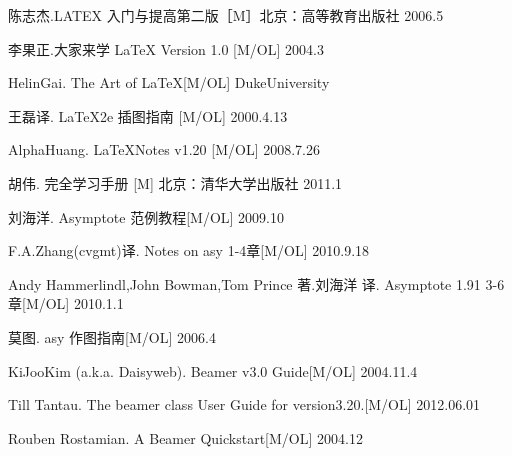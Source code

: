 \begin{thebibliography}{99} %
\setlength{\parskip}{0pt}  %

 陈志杰.LATEX 入门与提高第二版［M］北京：高等教育出版社 2006.5

 李果正.大家来学 \LaTeX{} Version 1.0 [M/OL] 2004.3

 HelinGai. The Art of \LaTeX [M/OL]  DukeUniversity

 王磊译.  \LaTeX2e 插图指南 [M/OL]  2000.4.13

 AlphaHuang. \LaTeX Notes v1.20 [M/OL]  2008.7.26

 胡伟. \LaTeXe 完全学习手册 [M]  北京：清华大学出版社 2011.1

刘海洋. Asymptote 范例教程[M/OL] 2009.10

F.A.Zhang(cvgmt)译. Notes on asy 1-4章[M/OL] 2010.9.18

 Andy Hammerlindl,John Bowman,Tom Prince 著.刘海洋 译. Asymptote 1.91 3-6章[M/OL] 2010.1.1

莫图.  asy 作图指南[M/OL] 2006.4

 KiJooKim (a.k.a. Daisyweb). Beamer v3.0 Guide[M/OL] 2004.11.4

 Till Tantau. The beamer class User Guide for version3.20.[M/OL] 2012.06.01

 Rouben Rostamian. A Beamer Quickstart[M/OL] 2004.12

\end{thebibliography}
\fancyhead[L]{\song\wuhao  }
\thispagestyle{fancy}
\clearpage
